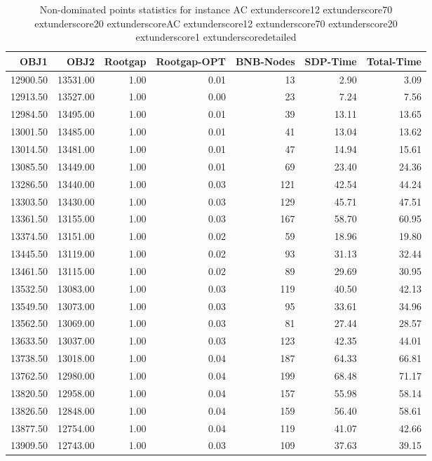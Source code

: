 \begin{table}
\caption{Non-dominated points statistics for instance AC	extunderscore12	extunderscore70	extunderscore20	extunderscoreAC	extunderscore12	extunderscore70	extunderscore20	extunderscore1	extunderscoredetailed}
\label{tab:stats/AC_12_70_20_AC_12_70_20_1_detailed}
\begin{tabular}{rrrrrrr}
\toprule
OBJ1 & OBJ2 & Rootgap & Rootgap-OPT & BNB-Nodes & SDP-Time & Total-Time \\
\midrule
12900.50 & 13531.00 & 1.00 & 0.01 & 13 & 2.90 & 3.09 \\
12913.50 & 13527.00 & 1.00 & 0.00 & 23 & 7.24 & 7.56 \\
12984.50 & 13495.00 & 1.00 & 0.01 & 39 & 13.11 & 13.65 \\
13001.50 & 13485.00 & 1.00 & 0.01 & 41 & 13.04 & 13.62 \\
13014.50 & 13481.00 & 1.00 & 0.01 & 47 & 14.94 & 15.61 \\
13085.50 & 13449.00 & 1.00 & 0.01 & 69 & 23.40 & 24.36 \\
13286.50 & 13440.00 & 1.00 & 0.03 & 121 & 42.54 & 44.24 \\
13303.50 & 13430.00 & 1.00 & 0.03 & 129 & 45.71 & 47.51 \\
13361.50 & 13155.00 & 1.00 & 0.03 & 167 & 58.70 & 60.95 \\
13374.50 & 13151.00 & 1.00 & 0.02 & 59 & 18.96 & 19.80 \\
13445.50 & 13119.00 & 1.00 & 0.02 & 93 & 31.13 & 32.44 \\
13461.50 & 13115.00 & 1.00 & 0.02 & 89 & 29.69 & 30.95 \\
13532.50 & 13083.00 & 1.00 & 0.03 & 119 & 40.50 & 42.13 \\
13549.50 & 13073.00 & 1.00 & 0.03 & 95 & 33.61 & 34.96 \\
13562.50 & 13069.00 & 1.00 & 0.03 & 81 & 27.44 & 28.57 \\
13633.50 & 13037.00 & 1.00 & 0.03 & 123 & 42.35 & 44.01 \\
13738.50 & 13018.00 & 1.00 & 0.04 & 187 & 64.33 & 66.81 \\
13762.50 & 12980.00 & 1.00 & 0.04 & 199 & 68.48 & 71.17 \\
13820.50 & 12958.00 & 1.00 & 0.04 & 157 & 55.98 & 58.14 \\
13826.50 & 12848.00 & 1.00 & 0.04 & 159 & 56.40 & 58.61 \\
13877.50 & 12754.00 & 1.00 & 0.04 & 119 & 41.07 & 42.66 \\
13909.50 & 12743.00 & 1.00 & 0.03 & 109 & 37.63 & 39.15 \\

\end{tabular}
\end{table}
